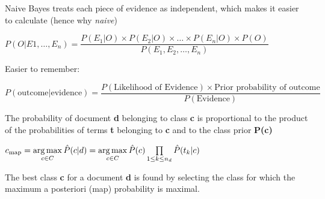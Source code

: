 \documentclass[
../../NLP4W_Summary.tex,
]
{subfiles}
\begin{document}
\begin{defbox}
    Naive Bayes treats each piece of evidence as independent, which makes it easier to calculate (hence why \textit{naive})
    \begin{center}
        \begin{smallmathbox*}
            $P(O|E1,\ldots,E_n) = \dfrac{P(E_1|O) \times P(E_2|O) \times \ldots \times P(E_n|O) \times P(O)}{P(E_1, E_2, \ldots, E_n)}$
        \end{smallmathbox*}
        
        Easier to remember:

        \begin{smallmathbox*}
            $P(\text{outcome}|\text{evidence}) = \dfrac{P(\text{Likelihood of Evidence}) \times \text{Prior probability of outcome}}{P(\text{Evidence})}$
        \end{smallmathbox*}
    \end{center}
\end{defbox}

\begin{defbox}
    \begin{center}
        \begin{smallmathbox*}
        \end{smallmathbox*}
    \end{center}
    The probability of document \textbf{d} belonging to class \textbf{c} is proportional to the product of the probabilities of terms \textbf{t} belonging to \textbf{c} and to the class prior \textbf{P(c)}

    \begin{center}
        \begin{smallmathbox*}
            $c_{\text{map}} = \mathop{\arg\max}\limits_{c \in C}\space \hat{P}(c|d) = \mathop{\arg\max}\limits_{c \in C} \space \hat{P}(c) \prod\limits_{1\leq k \leq n_d} \hat{P}(t_k | c)$ 
        \end{smallmathbox*}
    \end{center}
    The best class \textbf{c} for a document \textbf{d} is found by selecting the class for which the maximum a posteriori (map) probability is maximal.
\end{defbox}
\end{document}
